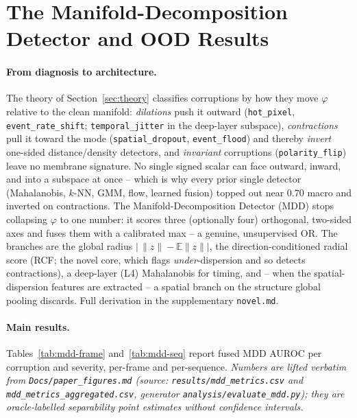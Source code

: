\section{The Manifold-Decomposition Detector and OOD Results}
\label{sec:method}

\paragraph{From diagnosis to architecture.}
The theory of Section~\ref{sec:theory} classifies corruptions by how they move $\varphi$
relative to the clean manifold: \emph{dilations} push it outward (\texttt{hot\_pixel},
\texttt{event\_rate\_shift}; \texttt{temporal\_jitter} in the deep-layer subspace),
\emph{contractions} pull it toward the mode (\texttt{spatial\_dropout}, \texttt{event\_flood})
and thereby \emph{invert} one-sided distance/density detectors, and \emph{invariant}
corruptions (\texttt{polarity\_flip}) leave no membrane signature. No single signed scalar can
face outward, inward, and into a subspace at once -- which is why every prior single detector
(Mahalanobis, $k$-NN, GMM, flow, learned fusion) topped out near $0.70$ macro and inverted on
contractions. The Manifold-Decomposition Detector (MDD) stops collapsing $\varphi$ to one
number: it scores three (optionally four) orthogonal, two-sided axes and fuses them with a
calibrated max -- a genuine, unsupervised OR. The branches are the global radius
$|\,\lVert z\rVert-\mathbb{E}\lVert z\rVert|$, the direction-conditioned radial score (RCF;
the novel core, which flags \emph{under}-dispersion and so detects contractions), a
deep-layer (L4) Mahalanobis for timing, and -- when the spatial-dispersion features are
extracted -- a spatial branch on the structure global pooling discards. Full derivation in the
supplementary \texttt{novel.md}.

\paragraph{Main results.}
Tables~\ref{tab:mdd-frame} and~\ref{tab:mdd-seq} report fused MDD AUROC per corruption and
severity, per-frame and per-sequence. \emph{Numbers are lifted verbatim from
\texttt{Docs/paper\_figures.md} (source: \texttt{results/mdd\_metrics.csv} and
\texttt{mdd\_metrics\_aggregated.csv}, generator \texttt{analysis/evaluate\_mdd.py}); they are
oracle-labelled separability point estimates without confidence intervals.}

